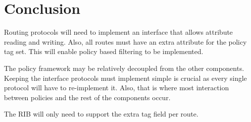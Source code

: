 \documentclass{article}
\begin{document}
\section{Conclusion}
Routing protocols will need to implement an interface that allows attribute
reading and writing. Also, all routes must have an extra attribute for the
policy tag set. This will enable policy based filtering to be implemented. 

The policy framework may be relatively decoupled from the other components.
Keeping the interface protocols must implement simple is crucial as every single
protocol will have to re-implement it. Also, that is where most interaction
between policies and the rest of the components occur. 

The RIB will only need to support the extra tag field per route. 
\end{document}
